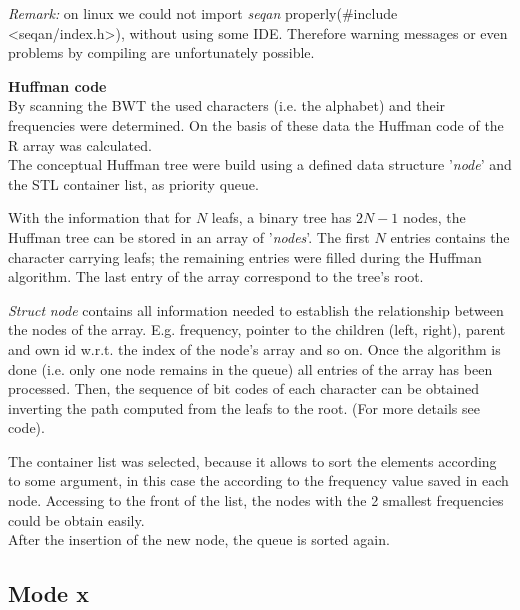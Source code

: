 \documentclass[11pt, notitlepage]{scrartcl}
\begin{document}
\emph{Remark:} on linux we could not import \textit{seqan} properly(\#include <seqan/index.h>), without using some IDE. Therefore warning messages or even problems by compiling are unfortunately possible.


\textbf{Huffman code}\\
By scanning the BWT the used characters (i.e. the alphabet) and their frequencies were determined. On the basis of these data the Huffman code of the R array was calculated.\\
The conceptual Huffman tree were build using a defined data structure '\textit{node}' and the STL container list, as priority queue.

With the information that for $N$ leafs, a binary tree has $2N-1$ nodes, the Huffman tree can be stored in an array of '\textit{nodes}'. The first $N$ entries contains the character carrying leafs; the remaining entries were filled during the Huffman algorithm. The last entry of the array correspond to the tree's root.

\textit{Struct} \textit{node} contains all information needed to establish the relationship between the nodes of the array. E.g. frequency, pointer to the children (left, right), parent and own id w.r.t. the index of the node's array and so on. Once the algorithm is done (i.e. only one node remains in the queue) all entries of the array has been processed. Then, the sequence of bit codes of each character can be obtained inverting the path computed from the leafs to the root. (For more details see code).

The container list was selected, because it allows to sort the elements according to some argument, in this case the according to the frequency value saved in each node. Accessing to the front of the list, the nodes with the 2 smallest frequencies could be obtain easily. \\
After the insertion of the new node, the queue is sorted again.

\subsection{Mode x}
\end{document}

